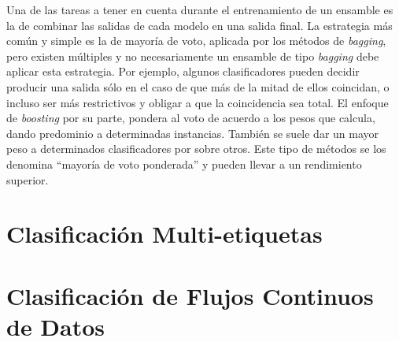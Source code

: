 \begin{description}
\end{description}

Una de las tareas a tener en cuenta durante el entrenamiento de un ensamble es
la de combinar las salidas de cada modelo en una salida final. La estrategia más
común y simple es la de mayoría de voto, aplicada por los métodos de
\textit{bagging}, pero existen múltiples y no necesariamente un ensamble de tipo
\textit{bagging} debe aplicar esta estrategia. Por ejemplo, algunos
clasificadores pueden decidir producir una salida sólo en el caso de que más de
la mitad de ellos coincidan, o incluso ser más restrictivos y obligar a que la
coincidencia sea total. El enfoque de \textit{boosting} por su parte, pondera al
voto de acuerdo a los pesos que calcula, dando predominio a determinadas
instancias.  También se suele dar un mayor peso a determinados clasificadores
por sobre otros. Este tipo de métodos se los denomina “mayoría de voto
ponderada” y pueden llevar a un rendimiento superior.



\section{Clasificación Multi-etiquetas}

\section{Clasificación de Flujos Continuos de Datos}

